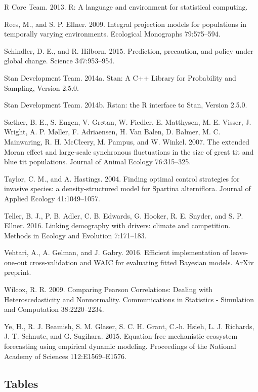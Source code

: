 \documentclass[12pt,]{article}
\begin{document}
R Core Team. 2013. R: A language and environment for statistical
computing.

Rees, M., and S. P. Ellner. 2009. Integral projection models for
populations in temporally varying environments. Ecological Monographs
79:575--594.

Schindler, D. E., and R. Hilborn. 2015. Prediction, precaution, and
policy under global change. Science 347:953--954.

Stan Development Team. 2014a. Stan: A C++ Library for Probability and
Sampling, Version 2.5.0.

Stan Development Team. 2014b. Rstan: the R interface to Stan, Version
2.5.0.

S{æ}ther, B. E., S. Engen, V. Gr{ø}tan, W. Fiedler, E. Matthysen, M. E.
Visser, J. Wright, A. P. M{ø}ller, F. Adriaensen, H. {Van Balen}, D.
Balmer, M. C. Mainwaring, R. H. McCleery, M. Pampus, and W. Winkel.
2007. The extended Moran effect and large-scale synchronous fluctuations
in the size of great tit and blue tit populations. Journal of Animal
Ecology 76:315--325.

Taylor, C. M., and A. Hastings. 2004. Finding optimal control strategies
for invasive species: a density-structured model for Spartina
alterniflora. Journal of Applied Ecology 41:1049--1057.

Teller, B. J., P. B. Adler, C. B. Edwards, G. Hooker, R. E. Snyder, and
S. P. Ellner. 2016. Linking demography with drivers: climate and
competition. Methods in Ecology and Evolution 7:171--183.

Vehtari, A., A. Gelman, and J. Gabry. 2016. Efficient implementation of
leave-one-out cross-validation and WAIC for evaluating fitted Bayesian
models. ArXiv preprint.

Wilcox, R. R. 2009. Comparing Pearson Correlations: Dealing with
Heteroscedasticity and Nonnormality. Communications in Statistics -
Simulation and Computation 38:2220--2234.

Ye, H., R. J. Beamish, S. M. Glaser, S. C. H. Grant, C.-h. Hsieh, L. J.
Richards, J. T. Schnute, and G. Sugihara. 2015. Equation-free
mechanistic ecosystem forecasting using empirical dynamic modeling.
Proceedings of the National Academy of Sciences 112:E1569--E1576.

\newpage{}

\subsection{Tables}\label{tables}
\end{document}
